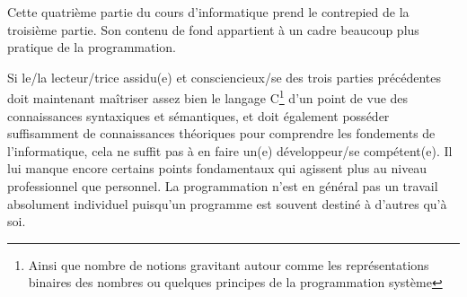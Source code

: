 \documentclass[../../main.tex]{subfiles}
\begin{document}
Cette quatrième partie du cours d'informatique prend le contrepied de la troisième partie. Son contenu de fond appartient à un cadre beaucoup plus pratique de la programmation.
 
Si le/la lecteur/trice assidu(e) et consciencieux/se des trois parties précédentes doit maintenant maîtriser assez bien le langage C\footnote{Ainsi que nombre de notions gravitant autour comme les représentations binaires des nombres ou quelques principes de la programmation système} d'un point de vue des connaissances syntaxiques et sémantiques, et doit également posséder suffisamment de connaissances théoriques pour comprendre les fondements de l'informatique, cela ne suffit pas à en faire un(e) développeur/se compétent(e). Il lui manque encore certains points fondamentaux qui agissent plus au niveau professionnel que personnel. La programmation n'est en général pas un travail absolument individuel puisqu'un programme est souvent destiné à d'autres qu'à soi.
\end{document}
